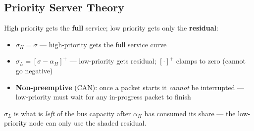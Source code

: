 \documentclass[10pt,a4paper]{article}
\begin{document}
\subsection*{Priority Server Theory}
\begin{minipage}[t]{0.52\textwidth}
High priority gets the \textbf{full} service; low priority gets only the \textbf{residual}:
\begin{itemize}
  \item $\sigma_H = \sigma$ \quad --- high-priority gets the full service curve
  \item $\sigma_L = [\sigma - \alpha_H]^+$ \quad --- low-priority gets residual; $[\cdot]^+$ clamps to zero (cannot go negative)
  \item \textbf{Non-preemptive} (CAN): once a packet starts it \emph{cannot} be interrupted --- low-priority must wait for any in-progress packet to finish
\end{itemize}
\end{minipage}\hfill
\begin{minipage}[t]{0.44\textwidth}
\vspace{0pt}
\centering
{}
\vspace{2pt}
\small$\sigma_L$ is what is \emph{left} of the bus capacity after $\alpha_H$ has consumed its share --- the low-priority node can only use the shaded residual.
\end{minipage}
\end{document}
